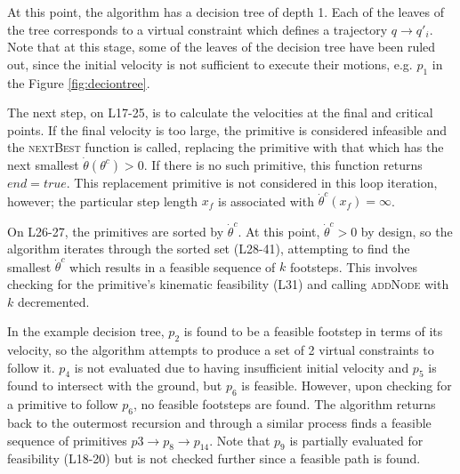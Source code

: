 At this point, the algorithm has a decision tree of depth 1. Each of the leaves of the tree corresponds to a virtual constraint which defines a trajectory $q\to q'_i$. Note that at this stage, some of the leaves of the decision tree have been ruled out, since the initial velocity is not sufficient to execute their motions, e.g. $p_1$ in the Figure \ref{fig:deciontree}.

The next step, on L17-25, is to calculate the velocities at the final and critical points. If the final velocity is too large, the primitive is considered infeasible and the \textsc{nextBest} function is called, replacing the primitive with that which has the next smallest $\dot{\theta}(\theta^c)>0$. If there is no such primitive, this function returns $end=true$. This replacement primitive is not considered in this loop iteration, however; the particular step length $x_f$ is associated with $\dot{\theta}^c(x_f) = \infty$.

On L26-27, the primitives are sorted by $\dot{\theta}^c$. At this point, $\dot{\theta}^c > 0$ by design, so the algorithm iterates through the sorted set (L28-41), attempting to find the smallest $\dot{\theta}^c$ which results in a feasible sequence of $k$ footsteps. This involves checking for the primitive's kinematic feasibility (L31) and calling \textsc{addNode} with $k$ decremented.

In the example decision tree, $p_2$ is found to be a feasible footstep in terms of its velocity, so the algorithm attempts to produce a set of 2 virtual constraints to follow it. $p_4$ is not evaluated due to having insufficient initial velocity and $p_5$ is found to intersect with the ground, but $p_6$ is feasible. However, upon checking for a primitive to follow $p_6$, no feasible footsteps are found. The algorithm returns back to the outermost recursion and through a similar process finds a feasible sequence of primitives $p3\to p_8 \to p_14$. Note that $p_9$ is partially evaluated for feasibility (L18-20) but is not checked further since a feasible path is found.

